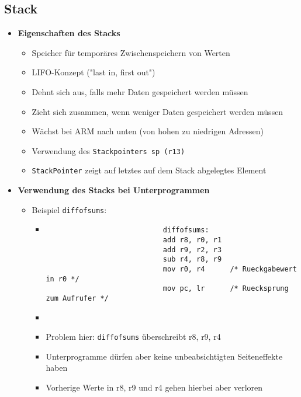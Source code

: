 \subsection{Stack}
    \begin{itemize}
        \item \textbf{Eigenschaften des Stacks}
            \begin{itemize}
                \item Speicher für temporäres Zwischenspeichern von Werten
                \item LIFO-Konzept (\string"last in, first out"\string)
                \item Dehnt sich aus, falls mehr Daten gespeichert werden müssen
                \item Zieht sich zusammen, wenn weniger Daten gespeichert werden müssen
                \item Wächst bei ARM nach unten (von hohen zu niedrigen Adressen)
                \item Verwendung des \texttt{Stackpointers sp (r13)}
                \item \texttt{StackPointer} zeigt auf letztes auf dem Stack abgelegtes Element
            \end{itemize}

        \item \textbf{Verwendung des Stacks bei Unterprogrammen}
            \begin{itemize}
                \item Beispiel \texttt{diffofsums}:
                    \begin{itemize}
                        \item[]
                            \begin{verbatim} 
                            diffofsums:
                            add r8, r0, r1
                            add r9, r2, r3
                            sub r4, r8, r9
                            mov r0, r4      /* Rueckgabewert in r0 */
                            mov pc, lr      /* Ruecksprung zum Aufrufer */
                            \end{verbatim}
                        \item[]
                        \item Problem hier: \texttt{diffofsums} überschreibt r8, r9, r4 
                        \item Unterprogramme dürfen aber keine unbeabsichtigten Seiteneffekte haben
                        \item Vorherige Werte in r8, r9 und r4 gehen hierbei aber verloren
                    \end{itemize}


\end{itemize}
\end{itemize}
